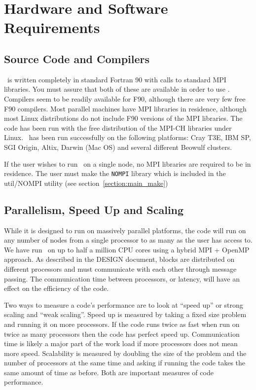 \section{Hardware and Software Requirements \label{section:requirements}}

\subsection{Source Code and Compilers \label{section:compiler}}

\BATSRUS\ is written completely in standard Fortran 90 with calls to
standard MPI libraries.  You must assure that both of these are available
in order to
use \BATSRUS.  Compilers seem to be readily available for
F90, although there are very few free F90 compilers.  Most parallel
machines have MPI libraries in residence, although most Linux
distributions do not include F90 versions of the MPI libraries.  The
code has been run with the free distribution of the MPI-CH libraries
under Linux. \BATSRUS\ has been run successfully on the following platforms:
Cray T3E, IBM SP, SGI Origin, Altix, Darwin (Mac OS) and several
different Beowulf clusters.

If the user wishes to run \BATSRUS\ on a single node, no MPI libraries
are required to be in residence.  The user must make the {\tt NOMPI}
library which is included in the util/NOMPI utility
(see section~\ref{section:main_make})

\subsection{Parallelism, Speed Up and Scaling \label{scaling}}

While it is designed to run on massively parallel platforms, the
code will run on any number of nodes from a single processor to as
many as the user has access to. We have run \BATSRUS\ on up
to half a million CPU cores using a hybrid MPI + OpenMP approach.
As described in the DESIGN document, blocks are distributed on different
processors and must communicate with each other through message passing.
The communication time between processors, or latency, will have an 
effect on the efficiency of the code.

Two ways to measure a code's performance are to look at ``speed up''
or strong scaling and ``weak scaling''.
Speed up is measured by taking a fixed size problem and running
it on more processors.  If the code runs twice as fast when run on twice as 
many processors then the code has perfect speed up.  Communication time is 
likely a major part of the work load if more processors does not mean
more speed.    
Scalability is measured by doubling the size of the problem and the number
of processors at the same time and asking if running the code takes the
same amount of time as before.  
Both are important measures of code performance.

